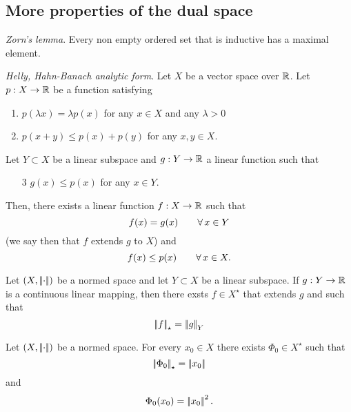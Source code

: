 \documentclass{article}
\begin{document}
\subsection{More properties of the dual space}
\begin{theorem}
	\emph{Zorn's lemma}. Every non empty ordered set that is inductive has a maximal element.
\end{theorem}
\begin{theorem}
	\emph{Helly, Hahn-Banach analytic form}. Let $X$ be a vector space over $\mathbb{R}$. Let $p:X\to\mathbb{R}$ be a function satisfying
	\begin{enumerate}
		\item $p(\lambda x)=\lambda p(x)$ for any $x\in X$ and any $\lambda>0$\\
		\item $p(x+y)\leq p(x)+p(y)$ for any $x,y\in X$.
	\end{enumerate} 
	Let $Y\subset X$ be a linear subspace and $g:Y\to\mathbb{R}$ a linear function such that
	\begin{enumerate}
		\item[3] $g(x)\leq p(x)$ for any $x\in Y$.  
	\end{enumerate}
	Then, there exists a linear function $f:X\to\mathbb{R}$ such that
	\begin{equation*}
		f(x)=g(x)\qquad\forall\, x\in Y
	\end{equation*}
	(we say then that $f$ extends $g$ to $X$) and
	\begin{equation*}
		f(x)\leq p(x)\qquad\forall\, x\in X.
	\end{equation*}
\end{theorem}
\begin{corollary}
	Let $\left(X,\left|\negthinspace\left|\cdot\right|\negthinspace\right|\right)$ be a normed space and let $Y\subset X$ be a linear subspace. If $g:Y\to\mathbb{R}$ is a continuous linear mapping, then there exsts $f\in X^{\star}$ that extends $g$ and such that
	\begin{equation*}
		\left|\negthinspace\left|f\right|\negthinspace\right|_{\star}=\left|\negthinspace\left|g\right|\negthinspace\right|_{Y}
	\end{equation*}
\end{corollary}
\begin{corollary}
	Let $\left(X,\left|\negthinspace\left|\cdot\right|\negthinspace\right|\right)$ be a normed space. For every $x_{0}\in X$ there exists $\Phi_{0}\in X^{\star}$ such that 
	\begin{equation*}
		\left|\negthinspace\left|\Phi_{0}\right|\negthinspace\right|_{\star}=\left|\negthinspace\left|x_{0}\right|\negthinspace\right|
	\end{equation*}
	and
	\begin{equation*}
		\Phi_{0}(x_{0})=\left|\negthinspace\left|x_{0}\right|\negthinspace\right|^{2}.
	\end{equation*}
\end{corollary}
\end{document}
